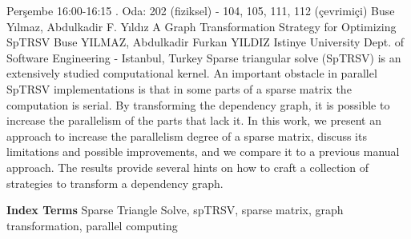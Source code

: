 
    \begin{abstract_basarim}
    {Perşembe 16:00-16:15}
    {.}
    {Oda: 202 (fiziksel) - 104, 105, 111, 112 (çevrimiçi)}
    {Buse Yılmaz, Abdulkadir F. Yıldız}
    {A Graph Transformation Strategy for Optimizing SpTRSV}
    {%
    Buse YILMAZ, Abdulkadir Furkan YILDIZ}
    {%
    }
    {%
    Istinye University Dept. of Software Engineering - Istanbul, Turkey}
    Sparse triangular solve (SpTRSV) is an extensively studied computational kernel. An important obstacle in parallel SpTRSV implementations is that in some parts of a sparse matrix the computation is serial. By transforming the dependency graph, it is possible to increase the parallelism of the parts that lack it. In this work, we present an approach to increase the parallelism degree of a sparse matrix, discuss its limitations and possible improvements, and we compare it to a previous manual approach. The results provide several hints on how to craft a collection of strategies to transform a dependency graph. 
    
            \textbf{Index Terms} \newline{}Sparse Triangle Solve, spTRSV, sparse matrix, graph transformation, parallel computing
    \end{abstract_basarim}
    